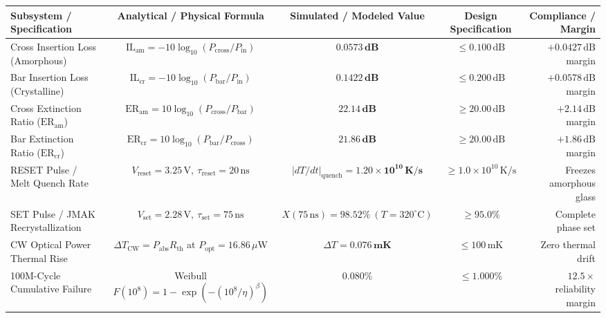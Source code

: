 \documentclass[letterpaper,10pt]{article}
\begin{document}
\begin{center}
\vspace{-4pt}
\label{tab:cycling_audit}
\vspace{-2pt}
\fontsize{6.0pt}{7.0pt}\selectfont
\begin{tabular*}{\textwidth}{l @{\extracolsep{\fill}} cccr}
\toprule
\textbf{Subsystem / Specification} & \textbf{Analytical / Physical Formula} & \textbf{Simulated / Modeled Value} & \textbf{Design Specification} & \textbf{Compliance / Margin} \\
\midrule
Cross Insertion Loss (Amorphous) & $\text{IL}_{\text{am}} = -10\log_{10}(P_{\text{cross}} / P_{\text{in}})$ & $\mathbf{0.0573\,\text{dB}}$ & $\le 0.100\,\text{dB}$ & $+0.0427\,\text{dB}$ margin \\
Bar Insertion Loss (Crystalline) & $\text{IL}_{\text{cr}} = -10\log_{10}(P_{\text{bar}} / P_{\text{in}})$ & $\mathbf{0.1422\,\text{dB}}$ & $\le 0.200\,\text{dB}$ & $+0.0578\,\text{dB}$ margin \\
Cross Extinction Ratio ($\text{ER}_{\text{am}}$) & $\text{ER}_{\text{am}} = 10\log_{10}(P_{\text{cross}} / P_{\text{bar}})$ & $\mathbf{22.14\,\text{dB}}$ & $\ge 20.00\,\text{dB}$ & $+2.14\,\text{dB}$ margin \\
Bar Extinction Ratio ($\text{ER}_{\text{cr}}$) & $\text{ER}_{\text{cr}} = 10\log_{10}(P_{\text{bar}} / P_{\text{cross}})$ & $\mathbf{21.86\,\text{dB}}$ & $\ge 20.00\,\text{dB}$ & $+1.86\,\text{dB}$ margin \\
RESET Pulse / Melt Quench Rate & $V_{\text{reset}} = 3.25\,\text{V},\ \tau_{\text{reset}} = 20\,\text{ns}$ & $|dT/dt|_{\text{quench}} = \mathbf{1.20 \times 10^{10}\,\text{K/s}}$ & $\ge 1.0 \times 10^{10}\,\text{K/s}$ & Freezes amorphous glass \\
SET Pulse / JMAK Recrystallization & $V_{\text{set}} = 2.28\,\text{V},\ \tau_{\text{set}} = 75\,\text{ns}$ & $X(75\,\text{ns}) = \mathbf{98.52\%}\ (T=320^\circ\text{C})$ & $\ge 95.0\%$ & Complete phase set \\
CW Optical Power Thermal Rise & $\Delta T_{\text{CW}} = P_{\text{abs}} R_{\text{th}}$ at $P_{\text{opt}} = 16.86\,\mu\text{W}$ & $\Delta T = \mathbf{0.076\,\text{mK}}$ & $\le 100\,\text{mK}$ & Zero thermal drift \\
100M-Cycle Cumulative Failure & Weibull $F(10^8) = 1 - \exp(-(10^8/\eta)^\beta)$ & $\mathbf{0.080\%}$ & $\le 1.000\%$ & $12.5\times$ reliability margin \\
\bottomrule
\end{tabular*}
\vspace{-4pt}
\end{center}
\end{document}
